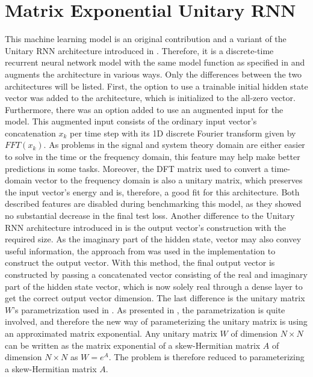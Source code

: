 \documentclass[draft,final]{vutinfth} %
\begin{document}
    \section{Matrix Exponential Unitary RNN} \label{meurnn}
    This machine learning model is an original contribution and a variant of the Unitary RNN architecture introduced in .
    Therefore, it is a discrete-time recurrent neural network model with the same model function as specified in  and augments the architecture in various ways.
    Only the differences between the two architectures will be listed.
    First, the option to use a trainable initial hidden state vector was added to the architecture, which is initialized to the all-zero vector.
    Furthermore, there was an option added to use an augmented input for the model.
    This augmented input consists of the ordinary input vector's concatenation $x_k$ per time step with its 1D discrete Fourier transform given by $FFT(x_k)$.
    As problems in the signal and system theory domain are either easier to solve in the time or the frequency domain, this feature may help make better predictions in some tasks.
    Moreover, the DFT matrix used to convert a time-domain vector to the frequency domain is also a unitary matrix, which preserves the input vector's energy and is, therefore, a good fit for this architecture.
    Both described features are disabled during benchmarking this model, as they showed no substantial decrease in the final test loss.
    Another difference to the Unitary RNN architecture introduced in  is the output vector's construction with the required size.
    As the imaginary part of the hidden state, vector may also convey useful information, the approach from \cite[p. 4]{UnitaryRNNs} was used in the implementation to construct the output vector.
    With this method, the final output vector is constructed by passing a concatenated vector consisting of the real and imaginary part of the hidden state vector, which is now solely real through a dense layer to get the correct output vector dimension.
    The last difference is the unitary matrix $W$'s parametrization used in .
    As presented in , the parametrization is quite involved, and therefore the new way of parameterizing the unitary matrix is using an approximated matrix exponential.
    Any unitary matrix $W$ of dimension $N \times N$ can be written as the matrix exponential of a skew-Hermitian matrix $A$ of dimension $N \times N$ as $W=e^A$. The problem is therefore reduced to parameterizing a skew-Hermitian matrix $A$.
\end{document}
